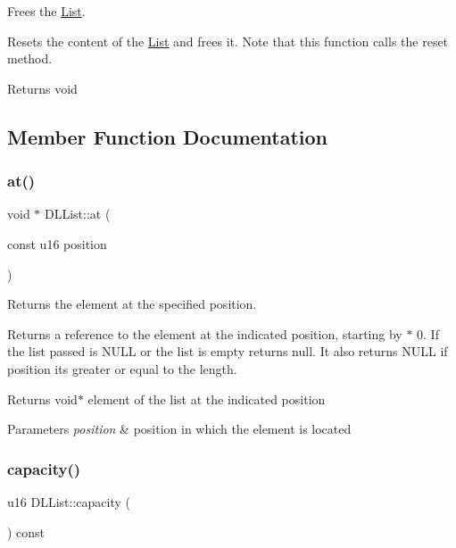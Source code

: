 Frees the \hyperlink{class_list}{List}. 

Resets the content of the \hyperlink{class_list}{List} and frees it. Note that this function calls the reset method.

\begin{DoxyReturn}{Returns}
void 
\end{DoxyReturn}


\subsection{Member Function Documentation}
\mbox{\label{class_d_l_list_ad32250353857bb6a02e1d9148da5eeca}} 
\subsubsection{\texorpdfstring{at()}{at()}}
{\footnotesize\ttfamily void $\ast$ D\+L\+List\+::at (\begin{DoxyParamCaption}\item[{const u16}]{position }\end{DoxyParamCaption})}



Returns the element at the specified position. 

Returns a reference to the element at the indicated position, starting by $\ast$ 0. If the list passed is N\+U\+LL or the list is empty returns null. It also returns N\+U\+LL if position it\textquotesingle{}s greater or equal to the length.

\begin{DoxyReturn}{Returns}
void$\ast$ element of the list at the indicated position 
\end{DoxyReturn}

\begin{DoxyParams}{Parameters}
{\em position} & position in which the element is located \\
\hline
\end{DoxyParams}
\mbox{\label{class_d_l_list_a7913658d122e6883ed7ddf3145567d67}} 
\subsubsection{\texorpdfstring{capacity()}{capacity()}}
{\footnotesize\ttfamily u16 D\+L\+List\+::capacity (\begin{DoxyParamCaption}{ }\end{DoxyParamCaption}) const}



